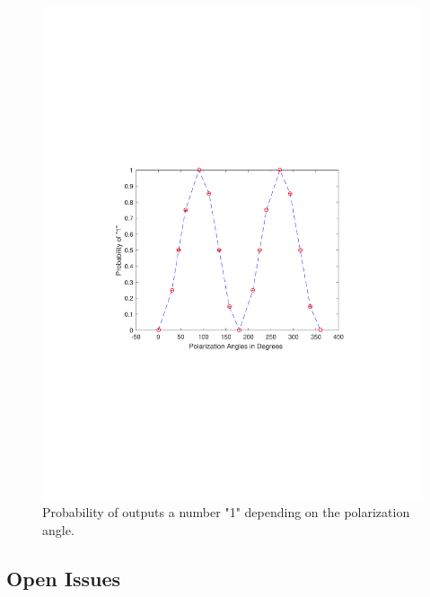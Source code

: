 \begin{figure}[H]
    \centering
        \includegraphics[clip, trim=4cm 9cm 4cm 6cm, width=1.00\textwidth]{./sdf/qrng/figures_raw/prob1.pdf}
    \caption{Probability of outputs a number "1" \space depending on the polarization angle.}\label{proby}
\end{figure}

\subsection{Open Issues}


\newpage




\cleardoublepage
